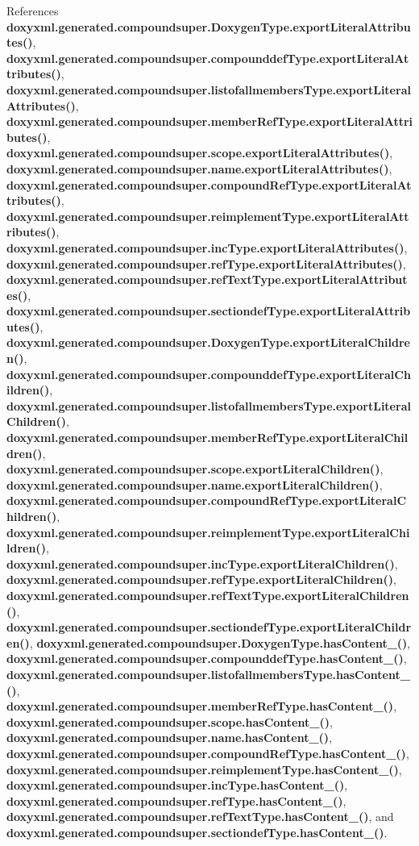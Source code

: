 References {\bf doxyxml.\+generated.\+compoundsuper.\+Doxygen\+Type.\+export\+Literal\+Attributes()}, {\bf doxyxml.\+generated.\+compoundsuper.\+compounddef\+Type.\+export\+Literal\+Attributes()}, {\bf doxyxml.\+generated.\+compoundsuper.\+listofallmembers\+Type.\+export\+Literal\+Attributes()}, {\bf doxyxml.\+generated.\+compoundsuper.\+member\+Ref\+Type.\+export\+Literal\+Attributes()}, {\bf doxyxml.\+generated.\+compoundsuper.\+scope.\+export\+Literal\+Attributes()}, {\bf doxyxml.\+generated.\+compoundsuper.\+name.\+export\+Literal\+Attributes()}, {\bf doxyxml.\+generated.\+compoundsuper.\+compound\+Ref\+Type.\+export\+Literal\+Attributes()}, {\bf doxyxml.\+generated.\+compoundsuper.\+reimplement\+Type.\+export\+Literal\+Attributes()}, {\bf doxyxml.\+generated.\+compoundsuper.\+inc\+Type.\+export\+Literal\+Attributes()}, {\bf doxyxml.\+generated.\+compoundsuper.\+ref\+Type.\+export\+Literal\+Attributes()}, {\bf doxyxml.\+generated.\+compoundsuper.\+ref\+Text\+Type.\+export\+Literal\+Attributes()}, {\bf doxyxml.\+generated.\+compoundsuper.\+sectiondef\+Type.\+export\+Literal\+Attributes()}, {\bf doxyxml.\+generated.\+compoundsuper.\+Doxygen\+Type.\+export\+Literal\+Children()}, {\bf doxyxml.\+generated.\+compoundsuper.\+compounddef\+Type.\+export\+Literal\+Children()}, {\bf doxyxml.\+generated.\+compoundsuper.\+listofallmembers\+Type.\+export\+Literal\+Children()}, {\bf doxyxml.\+generated.\+compoundsuper.\+member\+Ref\+Type.\+export\+Literal\+Children()}, {\bf doxyxml.\+generated.\+compoundsuper.\+scope.\+export\+Literal\+Children()}, {\bf doxyxml.\+generated.\+compoundsuper.\+name.\+export\+Literal\+Children()}, {\bf doxyxml.\+generated.\+compoundsuper.\+compound\+Ref\+Type.\+export\+Literal\+Children()}, {\bf doxyxml.\+generated.\+compoundsuper.\+reimplement\+Type.\+export\+Literal\+Children()}, {\bf doxyxml.\+generated.\+compoundsuper.\+inc\+Type.\+export\+Literal\+Children()}, {\bf doxyxml.\+generated.\+compoundsuper.\+ref\+Type.\+export\+Literal\+Children()}, {\bf doxyxml.\+generated.\+compoundsuper.\+ref\+Text\+Type.\+export\+Literal\+Children()}, {\bf doxyxml.\+generated.\+compoundsuper.\+sectiondef\+Type.\+export\+Literal\+Children()}, {\bf doxyxml.\+generated.\+compoundsuper.\+Doxygen\+Type.\+has\+Content\+\_\+()}, {\bf doxyxml.\+generated.\+compoundsuper.\+compounddef\+Type.\+has\+Content\+\_\+()}, {\bf doxyxml.\+generated.\+compoundsuper.\+listofallmembers\+Type.\+has\+Content\+\_\+()}, {\bf doxyxml.\+generated.\+compoundsuper.\+member\+Ref\+Type.\+has\+Content\+\_\+()}, {\bf doxyxml.\+generated.\+compoundsuper.\+scope.\+has\+Content\+\_\+()}, {\bf doxyxml.\+generated.\+compoundsuper.\+name.\+has\+Content\+\_\+()}, {\bf doxyxml.\+generated.\+compoundsuper.\+compound\+Ref\+Type.\+has\+Content\+\_\+()}, {\bf doxyxml.\+generated.\+compoundsuper.\+reimplement\+Type.\+has\+Content\+\_\+()}, {\bf doxyxml.\+generated.\+compoundsuper.\+inc\+Type.\+has\+Content\+\_\+()}, {\bf doxyxml.\+generated.\+compoundsuper.\+ref\+Type.\+has\+Content\+\_\+()}, {\bf doxyxml.\+generated.\+compoundsuper.\+ref\+Text\+Type.\+has\+Content\+\_\+()}, and {\bf doxyxml.\+generated.\+compoundsuper.\+sectiondef\+Type.\+has\+Content\+\_\+()}.



